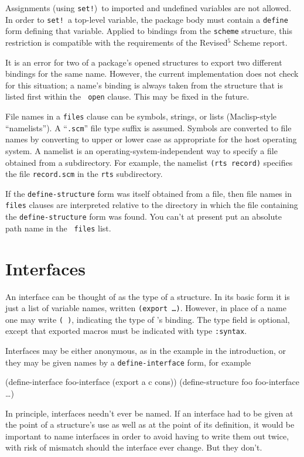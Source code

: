 Assignments (using {\tt set!})\ to imported and undefined variables
are not allowed.  In order to {\tt set!}\ a top-level variable, the
package body must contain a {\tt define} form defining that variable.
Applied to bindings from the {\tt scheme} structure, this restriction
is compatible with the requirements of the Revised$^5$ Scheme report.

It is an error for two of a package's opened structures to export two
different bindings for the same name.  However, the current
implementation does not check for this situation; a name's binding is
always taken from the structure that is listed first within the {\tt
open} clause.  This may be fixed in the future.

File names in a {\tt files} clause can be symbols, strings, or lists
(Maclisp-style ``namelists'').  A ``{\tt.scm}'' file type suffix is
assumed.  Symbols are converted to file names by converting to upper
or lower case as appropriate for the host operating system.  A
namelist is an operating-system-independent way to specify a file
obtained from a subdirectory.  For example, the namelist {\tt(rts
record)} specifies the file {\tt record.scm} in the {\tt rts}
subdirectory.

If the {\tt define-structure} form was itself obtained from a file,
then file names in {\tt files} clauses are interpreted relative to the
directory in which the file containing the {\tt define-structure} form
was found.  You can't at present put an absolute path name in the {\tt
files} list.


\section{Interfaces}

An interface can be thought of as the type of a structure.  In its
basic form it is just a list of variable names, written {\tt(export
 \ldots)}.  However, in place of
a name one may write {\tt ( )}, indicating the type
of 's binding.
The type field is optional, except
 that exported macros must be indicated with type {\tt :syntax}.

Interfaces may be either anonymous, as in the example in the
introduction, or they may be given names by a {\tt define-interface}
form, for example
\begin{example}
(define-interface foo-interface (export a c cons))
(define-structure foo foo-interface \ldots)
\end{example}
In principle, interfaces needn't ever be named.  If an interface
had to be given at the point of a structure's use as well as at the
point of its definition, it would be important to name interfaces in
order to avoid having to write them out twice, with risk of mismatch
should the interface ever change.  But they don't.

